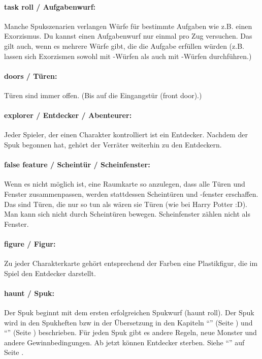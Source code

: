 \paragraph{task roll / Aufgabenwurf:} Manche Spukszenarien verlangen Würfe für bestimmte Aufgaben wie z.B. einen Exorzismus. Du kannst einen Aufgabenwurf nur einmal pro Zug versuchen. Das gilt auch, wenn es mehrere Würfe gibt, die die Aufgabe erfüllen würden (z.B. lassen sich Exorzismen sowohl mit \sanity-Würfen als auch mit \know-Würfen durchführen.)

\paragraph{doors / Türen:} Türen sind immer offen. (Bis auf die Eingangstür (front door).)

\paragraph{explorer / Entdecker / Abenteurer:} Jeder Spieler, der einen Charakter kontrolliert ist ein Entdecker. Nachdem der Spuk begonnen hat, gehört der Verräter weiterhin zu den Entdeckern.

\paragraph{false feature / Scheintür / Scheinfenster:} Wenn es nicht möglich ist, eine Raumkarte so anzulegen, dass alle Türen und Fenster zusammenpassen, werden stattdessen Scheintüren und -fenster erschaffen. Das sind Türen, die nur so tun als wären sie Türen (wie bei Harry Potter :D). Man kann sich nicht durch Scheintüren bewegen. Scheinfenster zählen nicht als Fenster.

\paragraph{figure / Figur:} Zu jeder Charakterkarte gehört entsprechend der Farben eine Plastikfigur, die im Spiel den Entdecker darstellt.

\paragraph{haunt / Spuk:} Der Spuk beginnt mit dem ersten erfolgreichen Spukwurf (haunt roll). Der Spuk wird in den Spukheften bzw in der Übersetzung in den Kapiteln ``'' (Seite \pageref{kap:sos}) und ``'' (Seite \pageref{kap:tt}) beschrieben. Für jeden Spuk gibt es andere Regeln, neue Monster und andere Gewinnbedingungen. Ab jetzt können Entdecker sterben. Siehe ``'' auf Seite \pageref{kap:rule:haunt}.

